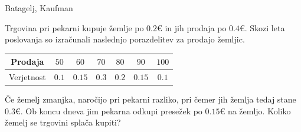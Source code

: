 \begin{naloga}{Batagelj, Kaufman}{\cite[Naloga~4.2]{bk}}
\begin{vprasanje}[zemljice]
Trgovina pri pekarni kupuje žemlje po $0.2 €$
in jih prodaja po $0.4 €$.
Skozi leta poslovanja so izračunali
naslednjo porazdelitev za prodajo žemljic.
\begin{center}
\begin{tabular}{c|cccccc}
Prodaja & $50$ & $60$ & $70$ & $80$ & $90$ & $100$ \\
\hline
Verjetnost & $0.1$ & $0.15$ & $0.3$ & $0.2$ & $0.15$ & $0.1$
\end{tabular}
\end{center}
Če žemelj zmanjka, naročijo pri pekarni razliko,
pri čemer jih žemlja tedaj stane $0.3 €$.
Ob koncu dneva jim pekarna odkupi presežek po $0.15 €$ na žemljo.
Koliko žemelj se trgovini splača kupiti?
\end{vprasanje}


\end{naloga}
